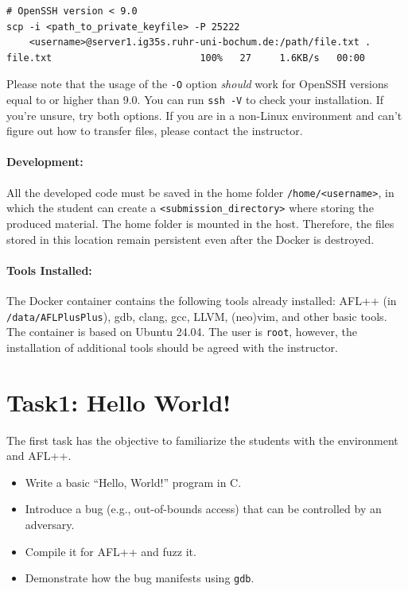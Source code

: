 \documentclass[12pt]{article}
\begin{document}
\begin{itemize}
\begin{lstlisting}
# OpenSSH version < 9.0        
scp -i <path_to_private_keyfile> -P 25222 
    <username>@server1.ig35s.ruhr-uni-bochum.de:/path/file.txt .
file.txt                          100%   27     1.6KB/s   00:00
    \end{lstlisting}
    Please note that the usage of the \texttt{-O} option \emph{should} work for
    OpenSSH versions equal to or higher than 9.0. You can run \texttt{ssh -V} to
    check your installation. If you're unsure, try both options. If you are in a
    non-Linux environment and can't figure out how to transfer files, please
    contact the instructor.
\end{itemize}

\paragraph{Development:}
All the developed code must be saved in the home folder
\texttt{/home/<username>}, in which the student can create a
\texttt{<submission\_directory>} where storing the produced material. The home
folder is mounted in the host. Therefore, the files stored in this location
remain persistent even after the Docker is destroyed.

\paragraph{Tools Installed:}
The Docker container contains the following tools already installed: AFL++ (in
\texttt{/data/AFLPlusPlus}), gdb, clang, gcc, LLVM, (neo)vim, and other basic
tools. The container is based on Ubuntu 24.04. The user is \texttt{root},
however, the installation of additional tools should be agreed with the
instructor.

 
\section*{Task1: Hello World!}

The first task has the objective to familiarize the students with the
environment and AFL++. 

\begin{itemize}
    \item Write a basic ``Hello, World!'' program in C.
    \item Introduce a bug (e.g., out-of-bounds access) that can be controlled by
    an adversary.
    \item Compile it for AFL++ and fuzz it.
    \item Demonstrate how the bug manifests using \texttt{gdb}.
\end{itemize}
\end{document}
